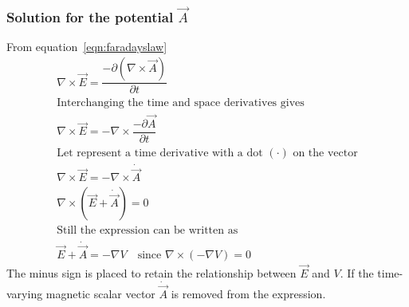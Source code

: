\subsubsection*{Solution for the potential $\vec{A}$}
From equation~\eqref{eqn:faradayslaw}
\begin{align*}
&\nabla\times\vec{E}=\dfrac{-\partial(\nabla\times\vec{A})}{\partial t}&\\
&\text{Interchanging the time and space derivatives gives}&\\
&\nabla\times\vec{E}=-\nabla\times\dfrac{-\partial\vec{A}}{\partial t}&\\
&\text{Let represent a time derivative with a dot }(\cdot)\text{ on the vector}&\\
&\nabla\times\vec{E}=-\nabla\times\dot{\vec{A}}&\\
&\nabla\times(\vec{E}+\dot{\vec{A}})=0&\\
&\text{Still the expression can be written as}&\\
&\vec{E}+\dot{\vec{A}}= -\nabla V\quad\text{since }\nabla\times(-\nabla V)=0&
\end{align*}
The minus sign is placed to retain the relationship between $\vec{E}$ and $V$. If the time-varying magnetic scalar vector $\dot{\vec{A}}$ is removed from the expression.

